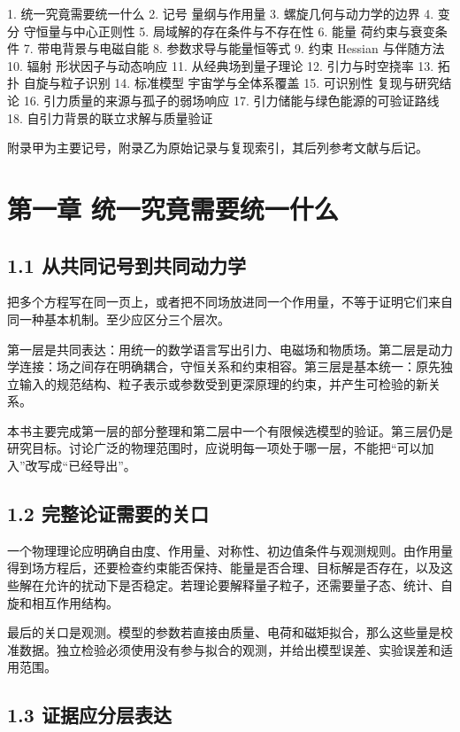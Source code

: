 \documentclass[UTF8,fontset=fandol,11pt]{ctexart}
\begin{document}
1. 统一究竟需要统一什么
2. 记号 量纲与作用量
3. 螺旋几何与动力学的边界
4. 变分 守恒量与中心正则性
5. 局域解的存在条件与不存在性
6. 能量 荷约束与衰变条件
7. 带电背景与电磁自能
8. 参数求导与能量恒等式
9. 约束 Hessian 与伴随方法
10. 辐射 形状因子与动态响应
11. 从经典场到量子理论
12. 引力与时空挠率
13. 拓扑 自旋与粒子识别
14. 标准模型 宇宙学与全体系覆盖
15. 可识别性 复现与研究结论
16. 引力质量的来源与孤子的弱场响应
17. 引力储能与绿色能源的可验证路线
18. 自引力背景的联立求解与质量验证

附录甲为主要记号，附录乙为原始记录与复现索引，其后列参考文献与后记。

\section*{第一章 统一究竟需要统一什么}

\subsection*{1.1 从共同记号到共同动力学}

把多个方程写在同一页上，或者把不同场放进同一个作用量，不等于证明它们来自同一种基本机制。至少应区分三个层次。

第一层是共同表达：用统一的数学语言写出引力、电磁场和物质场。第二层是动力学连接：场之间存在明确耦合，守恒关系和约束相容。第三层是基本统一：原先独立输入的规范结构、粒子表示或参数受到更深原理的约束，并产生可检验的新关系。

本书主要完成第一层的部分整理和第二层中一个有限候选模型的验证。第三层仍是研究目标。讨论广泛的物理范围时，应说明每一项处于哪一层，不能把“可以加入”改写成“已经导出”。

\subsection*{1.2 完整论证需要的关口}

一个物理理论应明确自由度、作用量、对称性、初边值条件与观测规则。由作用量得到场方程后，还要检查约束能否保持、能量是否合理、目标解是否存在，以及这些解在允许的扰动下是否稳定。若理论要解释量子粒子，还需要量子态、统计、自旋和相互作用结构。

最后的关口是观测。模型的参数若直接由质量、电荷和磁矩拟合，那么这些量是校准数据。独立检验必须使用没有参与拟合的观测，并给出模型误差、实验误差和适用范围。

\subsection*{1.3 证据应分层表达}
\end{document}
